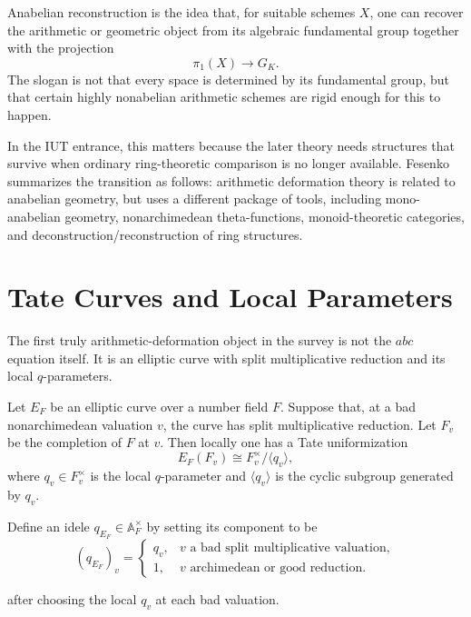 \begin{definition}
Anabelian reconstruction is the idea that, for suitable schemes \(X\), one can recover the arithmetic or geometric object from its algebraic fundamental group together with the projection
\[
  \pi_1(X)\longrightarrow G_K.
\]
The slogan is not that every space is determined by its fundamental group, but that certain highly nonabelian arithmetic schemes are rigid enough for this to happen.
\end{definition}

In the IUT entrance, this matters because the later theory needs structures that survive when ordinary ring-theoretic comparison is no longer available.  Fesenko summarizes the transition as follows: arithmetic deformation theory is related to anabelian geometry, but uses a different package of tools, including mono-anabelian geometry, nonarchimedean theta-functions, monoid-theoretic categories, and deconstruction/reconstruction of ring structures.

\section{Tate Curves and Local Parameters}

The first truly arithmetic-deformation object in the survey is not the \(abc\) equation itself.  It is an elliptic curve with split multiplicative reduction and its local \(q\)-parameters.

Let \(E_F\) be an elliptic curve over a number field \(F\).  Suppose that, at a bad nonarchimedean valuation \(v\), the curve has split multiplicative reduction.  Let \(F_v\) be the completion of \(F\) at \(v\).  Then locally one has a Tate uniformization
\[
  E_F(F_v)\cong F_v^{\times}/\langle q_v\rangle,
\]
where \(q_v\in F_v^{\times}\) is the local \(q\)-parameter and \(\langle q_v\rangle\) is the cyclic subgroup generated by \(q_v\).

\begin{definition}
Define an idele \(q_{E_F}\in \mathbb A_F^{\times}\) by setting its component to be
\[
  (q_{E_F})_v=\begin{cases}
  q_v,& v\text{ a bad split multiplicative valuation},\\
  1,& v\text{ archimedean or good reduction}.
  \end{cases}
\]

after choosing the local \(q_v\) at each bad valuation.
\end{definition}

